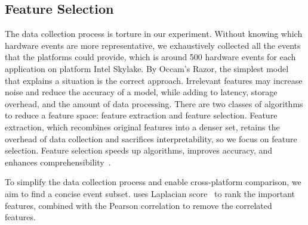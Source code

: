 \subsection{Feature Selection}
The data collection process is torture in our experiment. Without knowing which hardware events are more representative, we exhaustively collected all the events that the platforms could provide, which is around 500 hardware events for each application on platform Intel Skylake. 
By Occam’s Razor, the simplest model that explains a situation is the correct approach. 
Irrelevant features may increase noise and reduce the accuracy of a model, while adding to latency, storage overhead, and the amount of data processing. There are two classes of algorithms to reduce a feature space: feature extraction and feature selection. 
Feature extraction, which recombines original features into a denser set, retains the overhead of data collection and sacrifices interpretability, so we focus on feature selection. Feature selection speeds up algorithms, improves accuracy, and enhances comprehensibility~\cite{guyon2003introduction}. 


To simplify the data collection process and enable cross-platform comparison, we aim to find a concise event subset. \us uses Laplacian score~\cite{he2005laplacian} to rank the important features, combined with the Pearson correlation to remove the correlated features.

